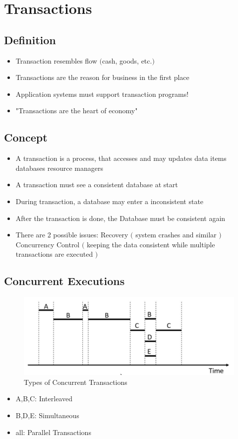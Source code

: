 \chapter{Transactions}
	\section{Definition}
		\begin{itemize}
			\item Transaction resembles flow $($cash, goods, etc.$)$
			\item Transactions are the reason for business in the first place
			\item Application systems must support transaction programs!
			\item \color{red}"Transactions are the heart of economy"\color{black}
		\end{itemize}
			
	
	\section{Concept}
		\begin{itemize}
			\item A transaction is a process, that accesses and may updates data items
				\subitem databases 
				\subitem resource managers
			\item A transaction must see a consistent database at start
			\item During transaction, a database may enter a inconsistent state
			\item After the transaction is done, the Database must be consistent again
			\item There are 2 possible issues:
			\subitem Recovery $($ system crashes and similar $)$ 
			\subitem Concurrency Control $($ keeping the data consistent while multiple transactions are executed $)$
		\end{itemize}
	
	\newpage
	\section{Concurrent Executions}
		\begin{figure}[h!]
			\includegraphics[scale=0.5]{res/Concurrent-Transactions.jpg}
			\caption{Types of Concurrent Transactions}
		\end{figure}
		\begin{itemize}
			\item A,B,C: Interleaved
			\item B,D,E: Simultaneous
			\item all: Parallel Transactions			
		\end{itemize}
	
